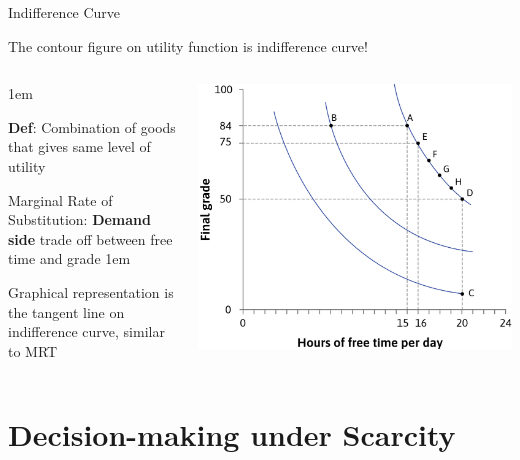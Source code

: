\documentclass[11pt,aspectratio=43,usenames,dvipsnames]{beamer}
\let\olditemize=\itemize
\let\endolditemize=\enditemize
\renewenvironment{itemize}{\olditemize \itemsep1em}{\endolditemize}
\theoremstyle{definition}
\begin{document}
\begin{frame}{Indifference Curve}
\label{slide:Indifference_Curve}

The contour figure on utility function is indifference curve!

\begin{columns}
    \begin{column}{0.4\textwidth}
        \begin{itemize}
            \item \textbf{Def}: Combination of goods that gives \alert{same level} of utility
            \item M{\tiny arginal }R{\tiny ate of }S{\tiny ubstitution}: \textbf{Demand side} trade off between free time and grade
            \begin{itemize}
                \item Graphical representation is the tangent line on indifference curve, similar to MRT
            \end{itemize}
        \end{itemize}
    \end{column}
    \begin{column}{0.6\textwidth}
        \includegraphics[width=\textwidth]{./figures/IndiffCurve.png}
    \end{column}
\end{columns}

\end{frame}

\section[Decision]{Decision-making under Scarcity}
\label{sec:Decision_making_under_Scarcity}
\end{document}
